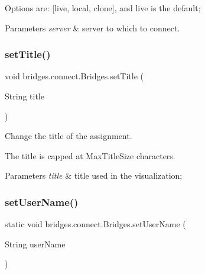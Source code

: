 Options are\+: \mbox{[}\textquotesingle{}live\textquotesingle{}, \textquotesingle{}local\textquotesingle{}, \textquotesingle{}clone\textquotesingle{}\mbox{]}, and \textquotesingle{}live\textquotesingle{} is the default;


\begin{DoxyParams}{Parameters}
{\em server} & server to which to connect. \\
\hline
\end{DoxyParams}
\mbox{\label{classbridges_1_1connect_1_1_bridges_aed3752ee6318a48dff271d9a9e2a8fcc}} 
\subsubsection{\texorpdfstring{set\+Title()}{setTitle()}}
{\footnotesize\ttfamily void bridges.\+connect.\+Bridges.\+set\+Title (\begin{DoxyParamCaption}\item[{String}]{title }\end{DoxyParamCaption})}



Change the title of the assignment. 

The title is capped at Max\+Title\+Size characters.


\begin{DoxyParams}{Parameters}
{\em title} & title used in the visualization; \\
\hline
\end{DoxyParams}
\mbox{\label{classbridges_1_1connect_1_1_bridges_af9b9a2ca03ba02c0c2be4716594678a6}} 
\subsubsection{\texorpdfstring{set\+User\+Name()}{setUserName()}}
{\footnotesize\ttfamily static void bridges.\+connect.\+Bridges.\+set\+User\+Name (\begin{DoxyParamCaption}\item[{String}]{user\+Name }\end{DoxyParamCaption})\hspace{0.3cm}{\ttfamily [static]}}

